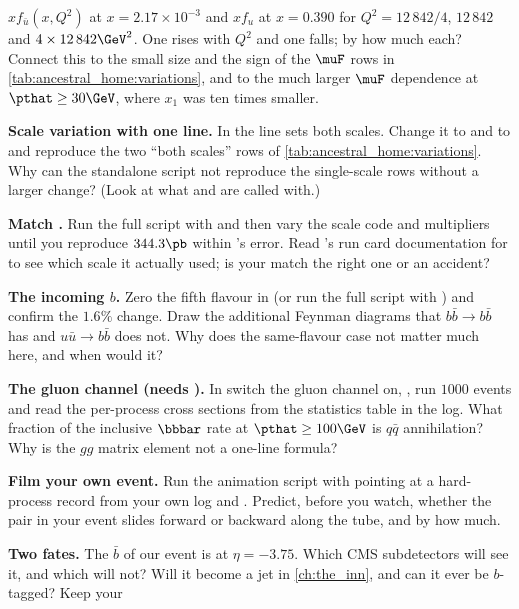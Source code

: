 \begin{exercises}
  $x f_{\bar u}(x,Q^2)$ at $x=2.17\times10^{-3}$ and $x f_u$ at $x=0.390$
  for $Q^2=12\,842/4$, $12\,842$ and $4\times12\,842\GeV^2$. One rises with
  $Q^2$ and one falls; by how much each? Connect this to the small size and
  the sign of the $\muF$ rows in \cref{tab:ancestral_home:variations}, and
  to the much larger $\muF$ dependence at $\pthat\ge30\GeV$, where
  $x_1$ was ten times smaller.
\item \textbf{Scale variation with one line.} In  the
  line  sets both scales. Change it to
   and to  and reproduce the two
  ``both scales'' rows of \cref{tab:ancestral_home:variations}. Why can the
  standalone script not reproduce the single-scale rows without a larger
  change? (Look at what  and  are called
  with.)
\item \textbf{Match \MG.} Run the full script with  and then vary the scale code and multipliers until you
  reproduce $344.3\pb$ within \MG's error. Read \MG's run card
  documentation for  to see which scale it
  actually used; is your match the right one or an accident?
\item \textbf{The incoming $b$.} Zero the fifth flavour in
   (or run the full script with ) and
  confirm the $1.6\%$ change. Draw the additional Feynman diagrams that
  $b\bar b\to b\bar b$ has and $u\bar u\to b\bar b$ does not. Why does the
  same-flavour case not matter much here, and when would it?
\item \textbf{The gluon channel (needs \CMSSW).} In 
  switch the gluon channel on, , run $1000$
  events and read the per-process cross sections from the statistics table
  in the log. What fraction of the inclusive $\bbbar$ rate at
  $\pthat\ge100\GeV$ is $q\bar q$ annihilation? Why is the $gg$ matrix
  element not a one-line formula?
\item \textbf{Film your own event.} Run the animation script with
   pointing at a hard-process record from your own \CMSSW log
  and . Predict, before you watch, whether the pair
  in your event slides forward or backward along the tube, and by how much.
\item \textbf{Two fates.} The $\bar b$ of our event is at $\eta=-3.75$.
  Which CMS subdetectors will see it, and which will not? Will it become a
  jet in \cref{ch:the_inn}, and can it ever be $b$-tagged? Keep your

\end{exercises}
